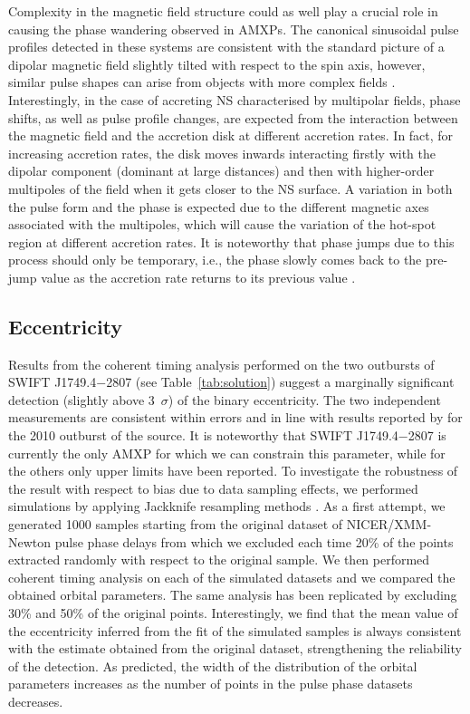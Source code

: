 \documentclass[fleqn,usenatbib]{mnras}
\newcommand{\swiftj}{SWIFT J1749.4$-$2807}
\newcommand{\nicer}{NICER}
\newcommand{\xmm}{XMM-Newton}
\begin{document}
Complexity in the magnetic field structure could as well play a crucial role in causing the phase wandering observed in AMXPs. The canonical sinusoidal pulse profiles detected in these systems are consistent with the standard picture of a dipolar magnetic field slightly tilted with respect to the spin axis, however, similar pulse shapes can arise from objects with more complex fields \citep[see e.g.,][]{Long:2008vb}. Interestingly, in the case of accreting NS characterised by multipolar fields, phase shifts, as well as pulse profile changes, are expected from the interaction between the magnetic field and the accretion disk at different accretion rates. In fact, for increasing accretion rates, the disk moves inwards interacting firstly with the dipolar component (dominant at large distances) and then with higher-order multipoles of the field when it gets closer to the NS surface. A variation in both the pulse form and the phase is expected due to the different magnetic axes associated with the multipoles, which will cause the variation of the hot-spot region at different accretion rates. It is noteworthy that phase jumps due to this process should only be temporary, i.e., the phase slowly comes back to the pre-jump value as the accretion rate returns to its previous value \citep{Long2012}.



\subsection{Eccentricity}
Results from the coherent timing analysis performed on the two outbursts of \swiftj{} (see Table~\ref{tab:solution}) suggest a marginally significant detection (slightly above 3~$\sigma$) of the binary eccentricity. The two independent measurements are consistent within errors and in line with results reported by \citet{Markwardt:2010tl} for the 2010 outburst of the source. It is noteworthy that \swiftj{} is currently the only AMXP for which we can constrain this parameter, while for the others only upper limits have been reported.  
To investigate the robustness of the result with respect to bias due to data sampling effects, we performed simulations by applying Jackknife resampling methods \citep[see e.g.,][]{Shao1995}. As a first attempt, we generated 1000 samples starting from the original dataset of \nicer{}/\xmm{} pulse phase delays from which we excluded each time 20\% of the points extracted randomly with respect to the original sample. We then performed coherent timing analysis on each of the simulated datasets and we compared the obtained orbital parameters. The same analysis has been replicated by excluding 30\% and 50\% of the original points. Interestingly, we find that the mean value of the eccentricity inferred from the fit of the simulated samples is always consistent with the estimate obtained from the original dataset, strengthening the reliability of the detection. As predicted, the width of the distribution of the orbital parameters increases as the number of points in the pulse phase datasets decreases. 
\end{document}

